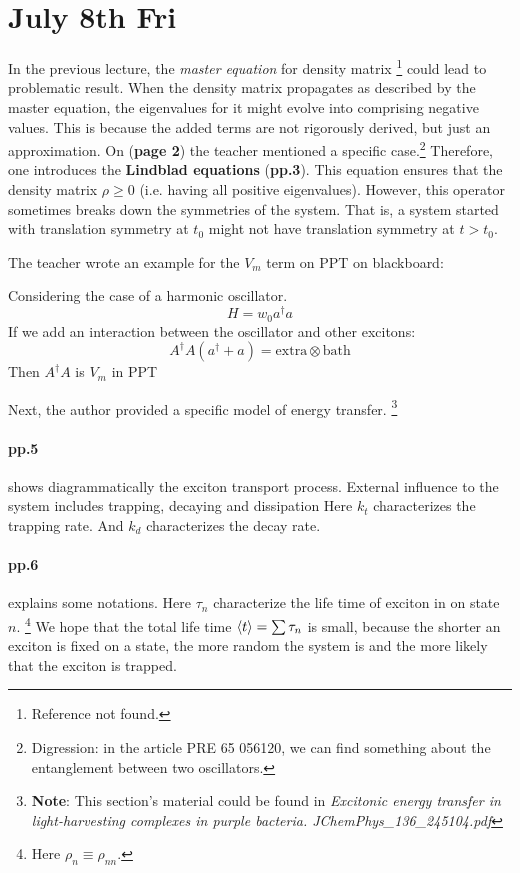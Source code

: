 \documentclass{article}
\numberwithin{equation}{subsection} %
\theoremstyle{definition}
\begin{document}
\section{July 8th Fri}
\label{sec:July_8th}
In the previous lecture, the \textit{master equation} for density matrix
\footnote{Reference not found.}
could lead to problematic result. When the density matrix propagates
as described by the master equation, the eigenvalues for it might
evolve into comprising negative values. This is because the added terms
are not rigorously derived, but just an approximation. On (\textbf{page 2}) the
teacher mentioned a specific case.\footnote{
    Digression: in the article PRE 65 056120, we can find
    something about the entanglement between two oscillators.
}
Therefore, one introduces the \textbf{Lindblad equations}
(\textbf{pp.3}). This equation ensures that the 
density matrix $\rho \geq 0$ (i.e. having all positive
eigenvalues). However, this operator sometimes breaks down
the symmetries of the system. That is, a system started with
translation symmetry at $t_0$ might not have translation
symmetry at $t > t_0$.

The teacher wrote an example for the $V_m$ term on PPT on blackboard:

Considering the case of a harmonic oscillator.
$$ H = w_0 a^\dagger a $$
If we add an interaction between the oscillator and other excitons:
$$ A^\dagger A (a^\dagger + a) = \text{extra} \otimes \text{bath}$$
Then $A^\dagger A$ is $V_m$ in PPT

Next, the author provided a specific model of energy transfer.
\footnote{
\textbf{Note}: This section's material could be found in
\textit{Excitonic energy transfer in light-harvesting complexes 
in purple bacteria. JChemPhys\_136\_245104.pdf}
}

\paragraph{pp.5} shows diagrammatically the exciton transport process.
External influence to the system includes trapping, decaying and dissipation
Here $k_t$ characterizes the trapping rate. And $k_d$ characterizes
the decay rate.

\paragraph{pp.6} explains some notations.
Here $\tau_n$ characterize the life time 
of exciton in on state $n$. \footnote{ Here
$\rho_n \equiv \rho_{nn}$.} We hope that the total life time
$\braket{t} = \sum \tau_n$
is small, because the shorter an exciton is fixed on a state,
the more random the system is and the more likely that the exciton
is trapped.
\end{document}
